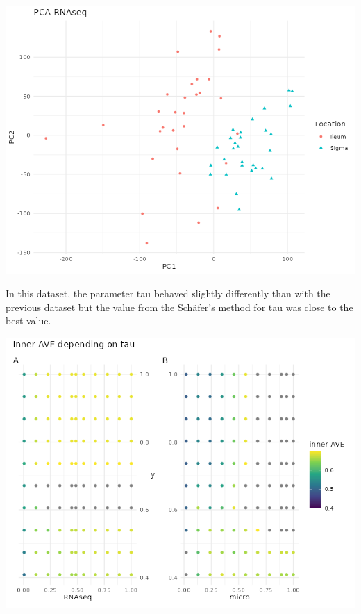 \documentclass[
  12pt,
  a4paper,
  twoside,
  openright]{book}
\let\origfigure\figure
\let\endorigfigure\endfigure
\renewenvironment{figure}[1][2] {
    \expandafter\origfigure\expandafter[!htbp]
} {
    \endorigfigure
}
\begin{document}
\begin{figure}
\includegraphics[width=1\linewidth]{images/hasler_PCA_RNAseq} \caption[PCA of RNAseq of the Häsler dataset.]{PCA of RNAseq of the Häsler dataset. There are two clear groups according to the location on the first component. Each point represents a sample (colored and shaped by location).}\label{fig:hasler-pca-RNAseq}
\end{figure}

In this dataset, the parameter tau behaved slightly differently than with the previous dataset but the value from the Schäfer's method for tau was close to the best value.

\begin{figure}
\includegraphics[width=1\linewidth]{images/hasler-centroid_tau} \caption[Tau effect on the inner AVE in the Häsler dataset.]{Tau effect on the inner AVE in the Häsler dataset. Changes on tau on the centroid scheme in the Häsler dataset affect the inner AVE score on the model 1. The panel A shows on the ordinate the RNAseq tau value, the panel B on the right, shows the tau of the microorganism; both of them show the y's tau on the abscissa.}\label{fig:hasler-tau}
\end{figure}
\end{document}
